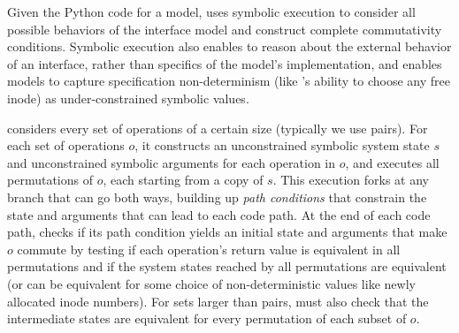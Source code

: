 
%
%
%

Given the Python code for a model, \analyzer uses symbolic execution to
consider all possible behaviors of the interface model and construct
complete commutativity conditions.  Symbolic execution also enables
\analyzer to reason about the external behavior of an interface, rather
than specifics of the model's implementation, and enables models to
capture specification non-determinism (like 's ability to
choose any free inode) as under-constrained symbolic values.

\analyzer considers every set of operations of a certain size (typically
we use pairs).  For each set of operations $o$, it constructs an
unconstrained symbolic system state $s$ and unconstrained
symbolic arguments
for each operation in $o$, and executes all permutations
of $o$, each starting from a copy of $s$.
This execution forks at any branch that can go both
ways, building up \emph{path conditions} that constrain the state and
arguments that can lead to each code path.
At the end of each code path, \analyzer checks if its path condition
yields an initial state and arguments that make $o$ commute by testing if each
operation's return value is
equivalent in all permutations and if the system states reached by all
permutations are equivalent (or can be equivalent for some
choice of non-deterministic values like newly allocated
inode numbers).
%
For sets larger than pairs, \analyzer must also check that the
intermediate states are equivalent for every permutation of each subset
of $o$.
%


